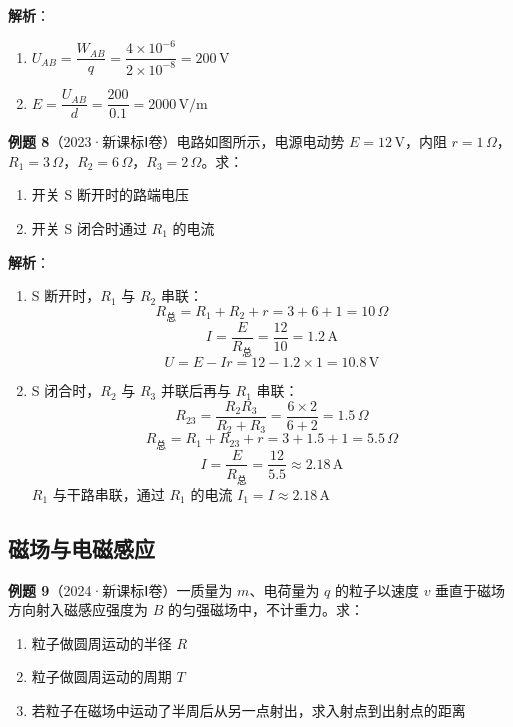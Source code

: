 \textbf{解析}：
\begin{enumerate}
  \item $U_{AB} = \dfrac{W_{AB}}{q} = \dfrac{4\times10^{-6}}{2\times10^{-8}} = 200\,\text{V}$
  \item $E = \dfrac{U_{AB}}{d} = \dfrac{200}{0.1} = 2000\,\text{V/m}$
\end{enumerate}

\vspace{1em}

\textbf{例题 8}（2023·新课标Ⅰ卷）电路如图所示，电源电动势 $E = 12\,\text{V}$，内阻 $r = 1\,\Omega$，$R_1 = 3\,\Omega$，$R_2 = 6\,\Omega$，$R_3 = 2\,\Omega$。求：
\begin{enumerate}
  \item 开关 S 断开时的路端电压
  \item 开关 S 闭合时通过 $R_1$ 的电流
\end{enumerate}

\textbf{解析}：
\begin{enumerate}
  \item S 断开时，$R_1$ 与 $R_2$ 串联：
  \[
  R_{\text{总}} = R_1 + R_2 + r = 3 + 6 + 1 = 10\,\Omega
  \]
  \[
  I = \frac{E}{R_{\text{总}}} = \frac{12}{10} = 1.2\,\text{A}
  \]
  \[
  U = E - Ir = 12 - 1.2\times1 = 10.8\,\text{V}
  \]

  \item S 闭合时，$R_2$ 与 $R_3$ 并联后再与 $R_1$ 串联：
  \[
  R_{23} = \frac{R_2R_3}{R_2+R_3} = \frac{6\times2}{6+2} = 1.5\,\Omega
  \]
  \[
  R_{\text{总}} = R_1 + R_{23} + r = 3 + 1.5 + 1 = 5.5\,\Omega
  \]
  \[
  I = \frac{E}{R_{\text{总}}} = \frac{12}{5.5} \approx 2.18\,\text{A}
  \]
  $R_1$ 与干路串联，通过 $R_1$ 的电流 $I_1 = I \approx 2.18\,\text{A}$
\end{enumerate}

\subsection{磁场与电磁感应}

\textbf{例题 9}（2024·新课标Ⅰ卷）一质量为 $m$、电荷量为 $q$ 的粒子以速度 $v$ 垂直于磁场方向射入磁感应强度为 $B$ 的匀强磁场中，不计重力。求：
\begin{enumerate}
  \item 粒子做圆周运动的半径 $R$
  \item 粒子做圆周运动的周期 $T$
  \item 若粒子在磁场中运动了半周后从另一点射出，求入射点到出射点的距离
\end{enumerate}

